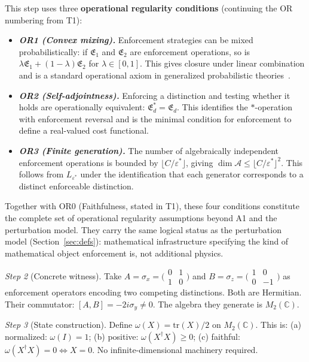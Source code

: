 \documentclass[11pt]{article}
\newenvironment{varlist}{\begin{itemize}[nosep,leftmargin=2em]}{\end{itemize}}
\begin{document}
\begin{tcolorbox}[apfbox, title={T2: Noncommutativity $\to$ Operator Algebra on Hilbert Space}]
This step uses three \textbf{operational regularity conditions} (continuing the OR numbering from T1):
\begin{varlist}
\item \textbf{\textit{OR1 (Convex mixing).}}  Enforcement strategies can be mixed probabilistically: if $\mathfrak{E}_1$ and $\mathfrak{E}_2$ are enforcement operations, so is $\lambda\mathfrak{E}_1 + (1-\lambda)\mathfrak{E}_2$ for $\lambda \in [0,1]$.  This gives closure under linear combination and is a standard operational axiom in generalized probabilistic theories~\cite{Hardy2001,CDP2011}.
\item \textbf{\textit{OR2 (Self-adjointness).}}  Enforcing a distinction and testing whether it holds are operationally equivalent: $\mathfrak{E}_d^* = \mathfrak{E}_d$.  This identifies the $*$-operation with enforcement reversal and is the minimal condition for enforcement to define a real-valued cost functional.
\item \textbf{\textit{OR3 (Finite generation).}}  The number of algebraically independent enforcement operations is bounded by $\lfloor C/\varepsilon^* \rfloor$, giving $\dim \mathcal{A} \le \lfloor C/\varepsilon^* \rfloor^2$.  This follows from $L_{\varepsilon^*}$ under the identification that each generator corresponds to a distinct enforceable distinction.
\end{varlist}
Together with OR0 (Faithfulness, stated in T1), these four conditions constitute the complete set of operational regularity assumptions beyond A1 and the perturbation model.  They carry the same logical status as the perturbation model (Section~\ref{sec:defs}): mathematical infrastructure specifying the kind of mathematical object enforcement is, not additional physics.

\textit{Step 2} (Concrete witness).  Take $A = \sigma_x = \bigl(\begin{smallmatrix} 0 & 1 \\ 1 & 0 \end{smallmatrix}\bigr)$ and $B = \sigma_z = \bigl(\begin{smallmatrix} 1 & 0 \\ 0 & -1 \end{smallmatrix}\bigr)$ as enforcement operators encoding two competing distinctions.  Both are Hermitian.  Their commutator: $[A, B] = -2i\sigma_y \ne 0$.  The algebra they generate is $M_2(\mathbb{C})$.

\textit{Step 3} (State construction).  Define $\omega(X) = \mathrm{tr}(X)/2$ on $M_2(\mathbb{C})$.  This is: (a) normalized: $\omega(I) = 1$; (b) positive: $\omega(X^\dagger X) \ge 0$; (c) faithful: $\omega(X^\dagger X) = 0 \iff X = 0$.  No infinite-dimensional machinery required.


\end{tcolorbox}
\end{document}

